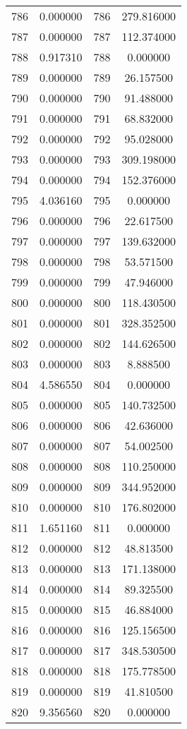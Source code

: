 \documentclass[12pt]{article}
\begin{document}
\begin{longtable}{@{}cccc@{}}
786 & 0.000000 & 786 & 279.816000 \\
787 & 0.000000 & 787 & 112.374000 \\
788 & 0.917310 & 788 & 0.000000 \\
789 & 0.000000 & 789 & 26.157500 \\
790 & 0.000000 & 790 & 91.488000 \\
791 & 0.000000 & 791 & 68.832000 \\
792 & 0.000000 & 792 & 95.028000 \\
793 & 0.000000 & 793 & 309.198000 \\
794 & 0.000000 & 794 & 152.376000 \\
795 & 4.036160 & 795 & 0.000000 \\
796 & 0.000000 & 796 & 22.617500 \\
797 & 0.000000 & 797 & 139.632000 \\
798 & 0.000000 & 798 & 53.571500 \\
799 & 0.000000 & 799 & 47.946000 \\
800 & 0.000000 & 800 & 118.430500 \\
801 & 0.000000 & 801 & 328.352500 \\
802 & 0.000000 & 802 & 144.626500 \\
803 & 0.000000 & 803 & 8.888500 \\
804 & 4.586550 & 804 & 0.000000 \\
805 & 0.000000 & 805 & 140.732500 \\
806 & 0.000000 & 806 & 42.636000 \\
807 & 0.000000 & 807 & 54.002500 \\
808 & 0.000000 & 808 & 110.250000 \\
809 & 0.000000 & 809 & 344.952000 \\
810 & 0.000000 & 810 & 176.802000 \\
811 & 1.651160 & 811 & 0.000000 \\
812 & 0.000000 & 812 & 48.813500 \\
813 & 0.000000 & 813 & 171.138000 \\
814 & 0.000000 & 814 & 89.325500 \\
815 & 0.000000 & 815 & 46.884000 \\
816 & 0.000000 & 816 & 125.156500 \\
817 & 0.000000 & 817 & 348.530500 \\
818 & 0.000000 & 818 & 175.778500 \\
819 & 0.000000 & 819 & 41.810500 \\
820 & 9.356560 & 820 & 0.000000 \\

\end{longtable}
\end{document}
